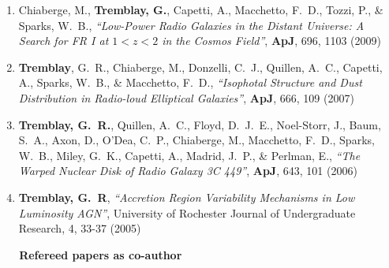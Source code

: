 \documentclass[11pt]{article}
\begin{document}
\begin{enumerate}
\item Chiaberge, M., \textbf{Tremblay, G.}, Capetti, A., Macchetto, F.~D., Tozzi, P.,
\& Sparks, W.~B.,  \textit{``Low-Power Radio Galaxies in the Distant Universe: A Search for FR I at $1< z < 2$ in the Cosmos Field''}, \textbf{ApJ}, 696,  1103 (2009)



\item \textbf{Tremblay}, G.~R., Chiaberge, M., Donzelli, C.~J., Quillen, A.~C.,
Capetti, A., Sparks, W.~B.,
\& Macchetto, F.~D., \textit{``Isophotal Structure and Dust Distribution in Radio-loud Elliptical Galaxies''}, \textbf{ApJ}, 666,  109 (2007)

\item \textbf{Tremblay, G.~R.}, Quillen, A.~C., Floyd, D.~J.~E., Noel-Storr, J., Baum,
S.~A., Axon, D., O'Dea, C.~P., Chiaberge, M., Macchetto, F.~D., Sparks,
W.~B., Miley, G.~K., Capetti, A., Madrid, J.~P.,
\& Perlman, E.,   \textit{``The Warped Nuclear Disk of Radio Galaxy 3C 449''}, \textbf{ApJ}, 643,  101 (2006)


\item \textbf{Tremblay, G.~R}, \textit{``Accretion Region Variability Mechanisms in Low Luminosity AGN''}, University of Rochester Journal of Undergraduate Research, 4, 33-37 (2005)

\end{enumerate}

\vspace{4mm}

\noindent \textbf{~~~Refereed papers as co-author}
\end{document}
